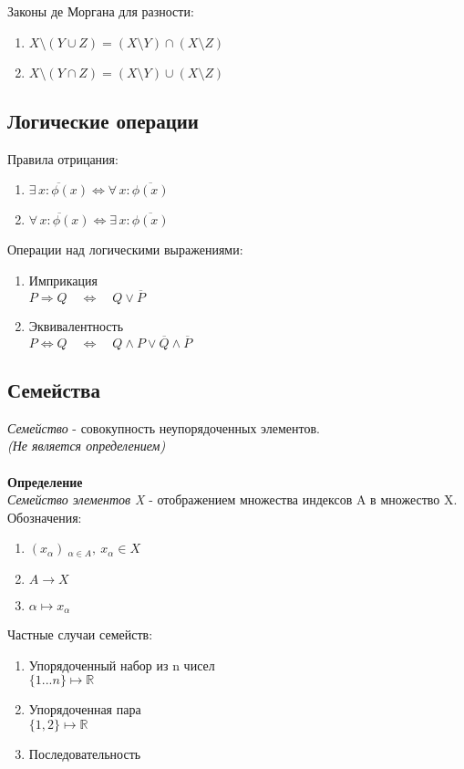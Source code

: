 \documentclass[12pt]{article}
\begin{document}
Законы де Моргана для разности:
\begin{enumerate}
    \item $X\setminus(Y \cup Z) = (X \setminus Y) \cap (X \setminus Z)$
    \item $X\setminus(Y \cap Z) = (X \setminus Y) \cup (X \setminus Z)$
\end{enumerate}
\subsection{Логические операции}
Правила отрицания:
\begin{enumerate}
    \item $\overline{\exists\,x: \phi(x)} \Leftrightarrow \forall\,x: \overline{\phi(x)}$
    \item $\overline{\forall\,x: \phi(x)} \Leftrightarrow \exists\,x: \overline{\phi(x)}$
\end{enumerate}
Операции над логическими выражениями:
\begin{enumerate}
    \item Имприкация\\$ P \Rightarrow Q \quad \Leftrightarrow \quad Q \lor \overline{P}$
    \item Эквивалентность\\$P \Leftrightarrow Q \quad \Leftrightarrow \quad Q \land P \lor \overline{Q} \land \overline{P}$
\end{enumerate}
\subsection{Семейства}
\textit{Семейство} - совокупность неупорядоченных элементов. \\\textit{(Не является определением)}\\\\
\textbf{Определение}\\
\textit{Семейство элементов X} - отображением множества индексов A в множество X.
Обозначения: 
\begin{enumerate}
    \item $(x_{\alpha})\ _{\alpha \in A},\ x_{\alpha} \in X$
    \item $A \rightarrow X$
    \item $\alpha \mapsto x_{\alpha}$
\end{enumerate}
Частные случаи семейств:
\begin{enumerate}
    \item Упорядоченный набор из n чисел\\$ \{1...n\} \mapsto \mathbb{R}$
    \item Упорядоченная пара\\$\{1,2\} \mapsto \mathbb{R}$
    \item Последовательность
\end{enumerate}
\end{document}
